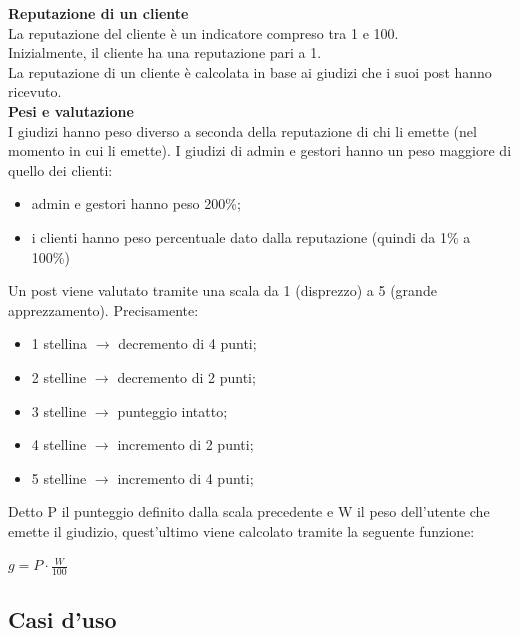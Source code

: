 \documentclass[a4paper, 14pt]{article}
\begin{document}
\begin{flushleft}
				\bigskip \textbf{Reputazione di un cliente} \\ \smallskip
				La reputazione del cliente è un indicatore compreso tra 1 e 100.\\
				Inizialmente, il cliente ha una reputazione pari a 1.\\
				La reputazione di un cliente è calcolata in base ai giudizi che i suoi post hanno ricevuto.\\
				
				
				\bigskip \textbf{Pesi e valutazione} \\ \smallskip				
				I giudizi hanno peso diverso a seconda della reputazione di chi li emette (nel momento in cui li emette). I giudizi di admin e gestori hanno un peso maggiore di quello dei clienti:
				\begin{itemize}
					\item admin e gestori hanno peso 200\%;
					\item i clienti hanno peso percentuale dato dalla reputazione (quindi da 1\% a 100\%)
				\end{itemize}
				
				Un post viene valutato tramite una scala da 1 (disprezzo) a 5 (grande apprezzamento). Precisamente:
				\begin{itemize}
					\item 1 stellina $\rightarrow$ decremento di 4 punti;
					\item 2 stelline $\rightarrow$ decremento di 2 punti;
					\item 3 stelline $\rightarrow$ punteggio intatto;
					\item 4 stelline $\rightarrow$ incremento di 2 punti;
					\item 5 stelline $\rightarrow$ incremento di 4 punti;
				\end{itemize}
			
				Detto P il punteggio definito dalla scala precedente e W il peso dell'utente che emette il giudizio, quest'ultimo viene calcolato tramite la seguente funzione:
				\begin{center}
					$ g = P \cdot \frac{W}{100} $
				\end{center}

		\subsection{Casi d'uso}

\end{flushleft}
\end{document}
